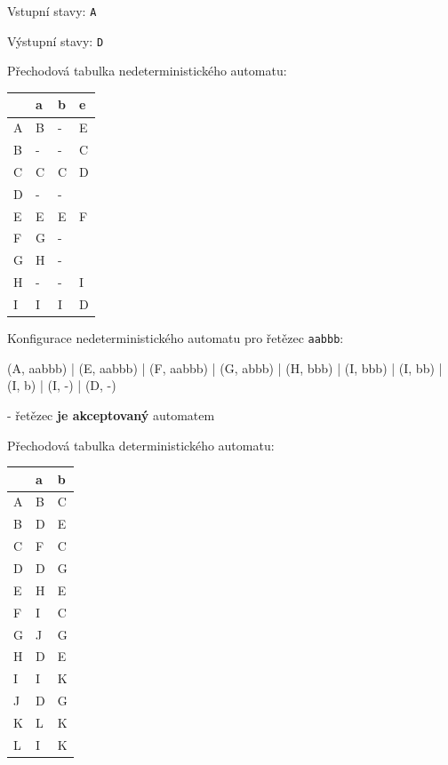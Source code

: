 \documentclass[11pt]{article}
\begin{document}
\bigskip

Vstupní stavy: \texttt{A}

Výstupní stavy: \texttt{D}

\bigskip

Přechodová tabulka nedeterministického automatu:

\bigskip

\begin{tabular}{| l | l | l || l |}
\hline
  & a & b & e \\ \hline
A & B & - & E \\ \hline
B & - & - & C \\ \hline
C & C & C & D \\ \hline
D & - & - &  \\ \hline
E & E & E & F \\ \hline
F & G & - &  \\ \hline
G & H & - &  \\ \hline
H & - & - & I \\ \hline
I & I & I & D \\
\hline
\end{tabular}

\bigskip

Konfigurace nedeterministického automatu pro řetězec \texttt{aabbb}:

(A, aabbb) | (E, aabbb) | (F, aabbb) | (G, abbb) | (H, bbb) | (I, bbb) | (I, bb) | (I, b) | (I, -) | (D, -)

- řetězec \textbf{je akceptovaný} automatem

\bigskip

Přechodová tabulka deterministického automatu:

\bigskip

\begin{tabular}{| l | l | l |}
\hline
  & a & b \\ \hline
A & B & C \\ \hline
B & D & E \\ \hline
C & F & C \\ \hline
D & D & G \\ \hline
E & H & E \\ \hline
F & I & C \\ \hline
G & J & G \\ \hline
H & D & E \\ \hline
I & I & K \\ \hline
J & D & G \\ \hline
K & L & K \\ \hline
L & I & K \\
\hline
\end{tabular}
\end{document}
